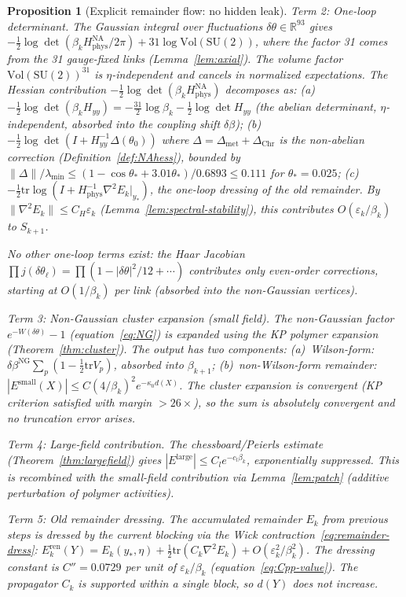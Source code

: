 \documentclass[11pt]{article}
\newtheorem{proposition}[theorem]{Proposition}
\theoremstyle{definition}
\newcommand{\SU}{\mathrm{SU}}
\newcommand{\tr}{\mathrm{tr}}
\newcommand{\R}{\mathbb{R}}
\begin{document}
\begin{proposition}[Explicit remainder flow: no hidden leak]
\emph{Term 2: One-loop determinant.}
The Gaussian integral over fluctuations
$\delta\theta\in\R^{93}$ gives
$-\frac{1}{2}\log\det(\beta_k H_{\mathrm{phys}}^{\mathrm{NA}}/2\pi)
+31\log\mathrm{Vol}(\SU(2))$,
where the factor 31 comes from
the 31 gauge-fixed links (Lemma~\ref{lem:axial}).
The volume factor $\mathrm{Vol}(\SU(2))^{31}$ is
$\eta$-independent and cancels in normalized expectations.
The Hessian contribution
$-\frac{1}{2}\log\det(\beta_k H_{\mathrm{phys}}^{\mathrm{NA}})$
decomposes as:
(a)~$-\frac{1}{2}\log\det(\beta_k H_{yy})
=-\frac{31}{2}\log\beta_k-\frac{1}{2}\log\det H_{yy}$
(the abelian determinant, $\eta$-independent,
absorbed into the coupling shift $\delta\beta$);
(b)~$-\frac{1}{2}\log\det(I+H_{yy}^{-1}\Delta(\theta_0))$
where $\Delta=\Delta_{\mathrm{met}}+\Delta_{\mathrm{Chr}}$
is the non-abelian correction
(Definition~\ref{def:NAhess}),
bounded by $\|\Delta\|/\lambda_{\min}
\le(1-\cos\theta_*+3.01\theta_*)/0.6893
\le 0.111$ for $\theta_*=0.025$;
(c)~$-\frac{1}{2}\mathrm{tr}\log(I+H_{\mathrm{phys}}^{-1}
\nabla^2 E_k|_{y_*})$, the one-loop dressing of the old
remainder.  By $\|\nabla^2 E_k\|\le C_H\varepsilon_k$
(Lemma~\ref{lem:spectral-stability}), this contributes
$O(\varepsilon_k/\beta_k)$ to $S_{k+1}$.

\emph{No other one-loop terms exist}: the Haar Jacobian
$\prod j(\delta\theta_\ell)=\prod(1-|\delta\theta|^2/12+\cdots)$
contributes only even-order corrections, starting at
$O(1/\beta_k)$ per link (absorbed into the non-Gaussian vertices).

\emph{Term 3: Non-Gaussian cluster expansion (small field).}
The non-Gaussian factor $e^{-W(\delta\theta)}-1$
(equation~\eqref{eq:NG}) is expanded using the KP
polymer expansion (Theorem~\ref{thm:cluster}).
The output has two components:
(a)~Wilson-form: $\delta\beta^{\mathrm{NG}}\sum_p(1-\frac{1}{2}\tr V_p)$,
absorbed into $\beta_{k+1}$;
(b)~non-Wilson-form remainder:
$|E^{\mathrm{small}}(X)|\le C(4/\beta_k)^2 e^{-\kappa_0 d(X)}$.
The cluster expansion is convergent (KP criterion satisfied
with margin $>26\times$), so the sum is absolutely convergent
and no truncation error arises.

\emph{Term 4: Large-field contribution.}
The chessboard/Peierls estimate
(Theorem~\ref{thm:largefield}) gives
$|E^{\mathrm{large}}|\le C_l e^{-c_l\beta_k}$,
exponentially suppressed.  This is recombined with the
small-field contribution via
Lemma~\ref{lem:patch} (additive perturbation of
polymer activities).

\emph{Term 5: Old remainder dressing.}
The accumulated remainder $E_k$ from previous steps is
dressed by the current blocking via the Wick
contraction~\eqref{eq:remainder-dress}:
$E_k^{\mathrm{ren}}(Y)=E_k(y_*,\eta)
+\frac{1}{2}\mathrm{tr}(C_k\nabla^2 E_k)
+O(\varepsilon_k^2/\beta_k^2)$.
The dressing constant is $C''=0.0729$ per unit of
$\varepsilon_k/\beta_k$
(equation~\eqref{eq:Cpp-value}).  The propagator $C_k$
is supported within a single block, so $d(Y)$ does not
increase.


\end{proposition}
\end{document}
